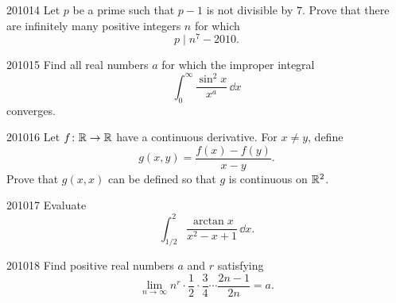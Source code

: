 \begin{problem}{2010}{1}{4}
Let $p$ be a prime such that $p-1$ is not divisible by $7$. Prove that there are infinitely many positive integers $n$ for which
\[
    p\mid n^7-2010.
\]
\end{problem}

\begin{problem}{2010}{1}{5}
Find all real numbers $a$ for which the improper integral
\[
    \int_0^{\infty}\frac{\sin^2x}{x^a}\, \dd x
\]
converges.
\end{problem}

\begin{problem}{2010}{1}{6}
Let $f\colon\mathbb{R}\to\mathbb{R}$ have a continuous derivative. For $x\ne y$, define
\[
    g(x, y)=\frac{f(x)-f(y)}{x-y}.
\]
Prove that $g(x, x)$ can be defined so that $g$ is continuous on $\mathbb{R}^2$.
\end{problem}

\begin{problem}{2010}{1}{7}
Evaluate
\[
    \int_{1/2}^{2}\frac{\arctan x}{x^2-x+1}\, \dd x.
\]
\end{problem}

\begin{problem}{2010}{1}{8}
Find positive real numbers $a$ and $r$ satisfying
\[
    \lim_{n\to\infty}
    n^r\cdot\frac12\cdot\frac34\cdots\frac{2n-1}{2n}
    =a.
\]
\end{problem}
